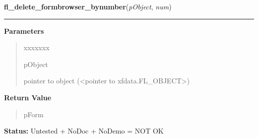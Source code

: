 \hspace{.8\funcindent}\begin{boxedminipage}{\funcwidth}

    \raggedright \textbf{fl\_delete\_formbrowser\_bynumber}(\textit{pObject}, \textit{num})

    \vspace{-1.5ex}

    \rule{\textwidth}{0.5\fboxrule}
\setlength{\parskip}{2ex}
\setlength{\parskip}{1ex}
      \textbf{Parameters}
      \vspace{-1ex}

      \begin{quote}
        \begin{Ventry}{xxxxxxx}

          \item[pObject]

          pointer to object ({\textless}pointer to 
          xfdata.FL\_OBJECT{\textgreater})

        \end{Ventry}

      \end{quote}

      \textbf{Return Value}
    \vspace{-1ex}

      \begin{quote}
      pForm

      \end{quote}

\textbf{Status:} Untested + NoDoc + NoDemo = NOT OK



    \end{boxedminipage}

    \label{xformslib:library:fl_delete_formbrowser}

    \vspace{0.5ex}

